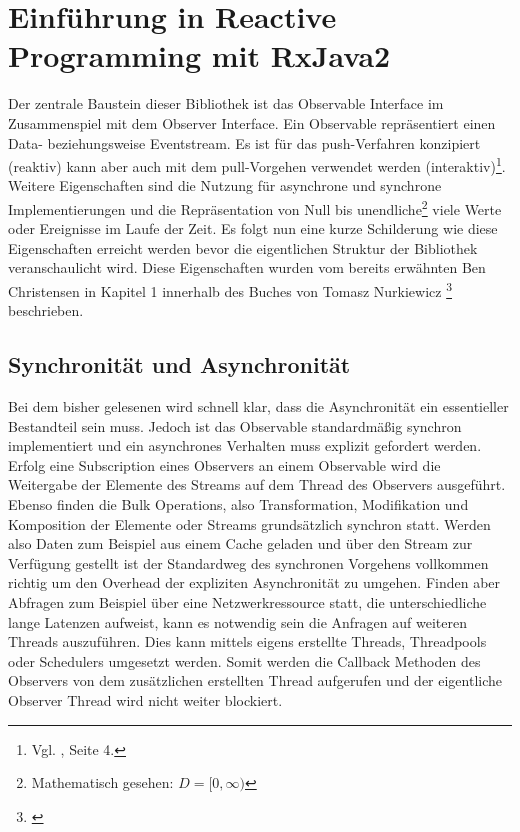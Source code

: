 \chapter{Einführung in Reactive Programming mit RxJava2}\label{rp_einfuehrung}
Der zentrale Baustein dieser Bibliothek ist das Observable Interface im Zusammenspiel mit dem Observer Interface. Ein Observable repräsentiert einen Data- beziehungsweise Eventstream. Es ist für das push-Verfahren konzipiert (reaktiv) kann aber auch mit dem pull-Vorgehen verwendet werden (interaktiv)\footnote{Vgl. \cite{Nurkiewicz.2017}, Seite 4.}. Weitere Eigenschaften sind die Nutzung für asynchrone und synchrone Implementierungen und die Repräsentation von Null bis unendliche\footnote{Mathematisch gesehen: $D = [0, \infty)$} viele Werte oder Ereignisse im Laufe der Zeit. Es folgt nun eine kurze Schilderung wie diese Eigenschaften erreicht werden bevor die eigentlichen Struktur der Bibliothek veranschaulicht wird. Diese Eigenschaften wurden vom bereits erwähnten Ben Christensen in Kapitel 1 innerhalb des Buches von Tomasz Nurkiewicz \footnote{\cite{Nurkiewicz.2017}} beschrieben.
\section{Synchronität und Asynchronität}
Bei dem bisher gelesenen wird schnell klar, dass die Asynchronität ein essentieller Bestandteil sein muss. Jedoch ist das Observable standardmäßig synchron implementiert und ein asynchrones Verhalten muss explizit gefordert werden. Erfolg eine Subscription eines Observers an einem Observable wird die Weitergabe der Elemente des Streams auf dem Thread des Observers ausgeführt. Ebenso finden die Bulk Operations, also Transformation, Modifikation und Komposition der Elemente oder Streams grundsätzlich synchron statt. Werden also Daten zum Beispiel aus einem Cache geladen und über den Stream zur Verfügung gestellt ist der Standardweg des synchronen Vorgehens vollkommen richtig um den Overhead der expliziten Asynchronität zu umgehen. Finden aber Abfragen zum Beispiel über eine Netzwerkressource statt, die unterschiedliche lange Latenzen aufweist, kann es notwendig sein die Anfragen auf weiteren Threads auszuführen. Dies kann mittels eigens erstellte Threads, Threadpools oder Schedulers umgesetzt werden. Somit werden die Callback Methoden des Observers von dem zusätzlichen erstellten Thread aufgerufen und der eigentliche Observer Thread wird nicht weiter blockiert.
